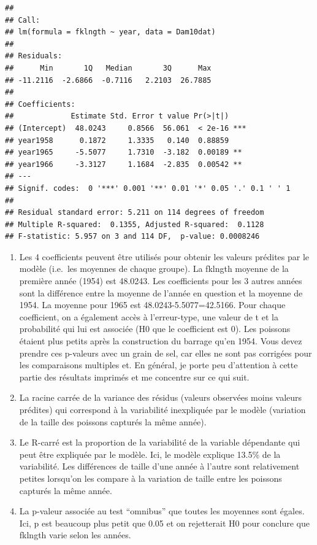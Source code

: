 \documentclass[12pt,]{book}
\providecommand{\tightlist}{%
  \setlength{\itemsep}{0pt}\setlength{\parskip}{0pt}}
\begin{document}
\begin{verbatim}
## 
## Call:
## lm(formula = fklngth ~ year, data = Dam10dat)
## 
## Residuals:
##      Min       1Q   Median       3Q      Max 
## -11.2116  -2.6866  -0.7116   2.2103  26.7885 
## 
## Coefficients:
##             Estimate Std. Error t value Pr(>|t|)    
## (Intercept)  48.0243     0.8566  56.061  < 2e-16 ***
## year1958      0.1872     1.3335   0.140  0.88859    
## year1965     -5.5077     1.7310  -3.182  0.00189 ** 
## year1966     -3.3127     1.1684  -2.835  0.00542 ** 
## ---
## Signif. codes:  0 '***' 0.001 '**' 0.01 '*' 0.05 '.' 0.1 ' ' 1
## 
## Residual standard error: 5.211 on 114 degrees of freedom
## Multiple R-squared:  0.1355,	Adjusted R-squared:  0.1128 
## F-statistic: 5.957 on 3 and 114 DF,  p-value: 0.0008246
\end{verbatim}

\begin{enumerate}
\def\labelenumi{\arabic{enumi}.}
\tightlist
\item
  Les 4 coefficients peuvent être utilisés pour obtenir les valeurs prédites par le modèle (i.e.~les moyennes de chaque groupe). La fklngth moyenne de la première année (1954) est 48.0243. Les coefficients pour les 3 autres années sont la différence entre la moyenne de l'année en question et la moyenne de 1954. La moyenne pour 1965 est 48.0243-5.5077=42.5166. Pour chaque coefficient, on a également accès à l'erreur-type, une valeur de t et la probabilité qui lui est associée (H0 que le coefficient est 0). Les poissons étaient plus petits après la construction du barrage qu'en 1954. Vous devez prendre ces p-valeurs avec un grain de sel, car elles ne sont pas corrigées pour les comparaisons multiples et. En général, je porte peu d'attention à cette partie des résultats imprimés et me concentre sur ce qui suit.
\item
  La racine carrée de la variance des résidus (valeurs observées moins valeurs prédites) qui correspond à la variabilité inexpliquée par le modèle (variation de la taille des poissons capturés la même année).
\item
  Le R-carré est la proportion de la variabilité de la variable dépendante qui peut être expliquée par le modèle. Ici, le modèle explique 13.5\% de la variabilité. Les différences de taille d'une année à l'autre sont relativement petites lorsqu'on les compare à la variation de taille entre les poissons capturés la même année.
\item
  La p-valeur associée au test ``omnibus'' que toutes les moyennes sont égales. Ici, p est beaucoup plus petit que 0.05 et on rejetterait H0 pour conclure que fklngth varie selon les années.
\end{enumerate}
\end{document}
